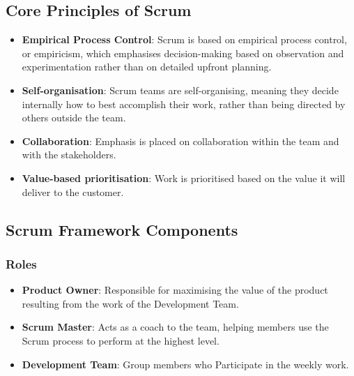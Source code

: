 \documentclass[sigconf,nonacm]{acmart}
\begin{document}
\subsection{Core Principles of Scrum}
\begin{itemize}
    \item \textbf{Empirical Process Control}: Scrum is based on empirical process control, or empiricism, which emphasises decision-making based on observation and experimentation rather than on detailed upfront planning.
    \item \textbf{Self-organisation}: Scrum teams are self-organising, meaning they decide internally how to best accomplish their work, rather than being directed by others outside the team.
    \item \textbf{Collaboration}: Emphasis is placed on collaboration within the team and with the stakeholders.
    \item \textbf{Value-based prioritisation}: Work is prioritised based on the value it will deliver to the customer.
\end{itemize}

\subsection{Scrum Framework Components}
\subsubsection{Roles}
\begin{itemize}
    \item \textbf{Product Owner}: Responsible for maximising the value of the product resulting from the work of the Development Team.
    \item \textbf{Scrum Master}: Acts as a coach to the team, helping members use the Scrum process to perform at the highest level.
    \item \textbf{Development Team}: Group members who Participate in the weekly work.
\end{itemize}
\end{document}
